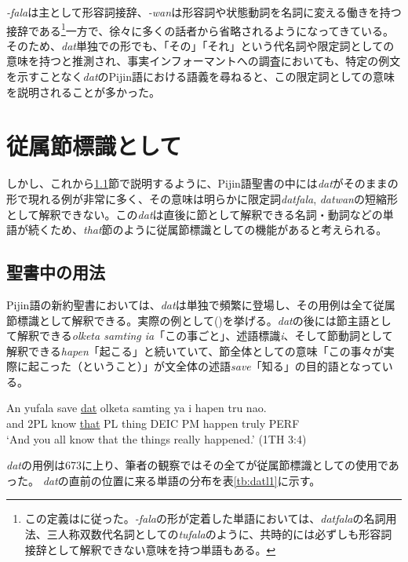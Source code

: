 \textit{-fala}は主として形容詞接辞、\textit{-wan}は形容詞や状態動詞を名詞に変える働きを持つ接辞である\footnote{
この定義は\cite{syntax}に従った。\textit{-fala}の形が定着した単語においては、\textit{datfala}の名詞用法、三人称双数代名詞としての\textit{tufala}のように、共時的には必ずしも形容詞接辞として解釈できない意味を持つ単語もある。}一方で、徐々に多くの話者から省略されるようになってきている\citep{syntax}。
そのため、\textit{dat}単独での形でも、「その」「それ」という代名詞や限定詞としての意味を持つと推測され、事実インフォーマントへの調査においても、特定の例文を示すことなく\textit{dat}のPijin語における語義を尋ねると、この限定詞としての意味を説明されることが多かった。

\section{従属節標識として}

しかし、これから\ref{sec:datbib}節で説明するように、Pijin語聖書の中には\textit{dat}がそのままの形で現れる例が非常に多く、その意味は明らかに限定詞\textit{datfala}, \textit{datwan}の短縮形として解釈できない。この\textit{dat}は直後に節として解釈できる名詞・動詞などの単語が続くため、\textit{that}節のように従属節標識としての機能があると考えられる。

\subsection{聖書中の用法}\label{sec:datbib}
Pijin語の新約聖書においては、\textit{dat}は単独で頻繁に登場し、その用例は全て従属節標識として解釈できる。実際の例として()を挙げる。\textit{dat}の後には節主語として解釈できる\textit{olketa samting ia}「この事ごと」、述語標識\textit{i}、そして節動詞として解釈できる\textit{hapen}「起こる」と続いていて、節全体としての意味「この事々が実際に起こった（ということ）」が文全体の述語\textit{save}「知る」の目的語となっている。

\begin{exe}
\ex
\gll An yufala save \underline{dat} olketa samting ya i hapen tru nao.\\
and 2PL know \underline{that} PL thing DEIC PM happen truly PERF\\
\glt `And you all know that the things really happened.' (1TH 3:4)
\end{exe}

\textit{dat}の用例は673に上り、筆者の観察ではその全てが従属節標識としての使用であった。
\textit{dat}の直前の位置に来る単語の分布を表\ref{tb:datl1}に示す。

